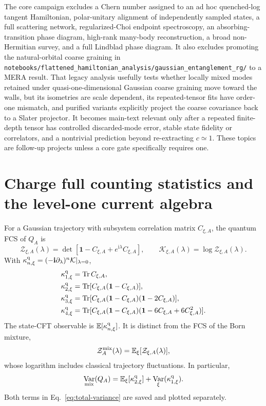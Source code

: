 \documentclass[aps,prx,onecolumn,nofootinbib,superscriptaddress,longbibliography]{revtex4-2}
\DeclareMathOperator{\Var}{Var}
\newcommand{\ii}{\boldsymbol{\mathrm{i}}}
\newcommand{\mc}[1]{\mathcal{#1}}
\newcommand{\Id}{\mathbf{1}}
\newcommand{\E}{\mathbb{E}}
\newcommand{\qTr}{\operatorname{Tr}}
\newcommand{\code}[1]{\texttt{#1}}
\begin{document}
The core campaign excludes a Chern number assigned to an ad hoc quenched-log tangent
Hamiltonian, polar-unitary alignment of independently sampled states, a full scattering
network, regularized-Choi endpoint spectroscopy, an absorbing-transition phase diagram,
high-rank many-body reconstruction, a broad non-Hermitian survey, and a full Lindblad phase
diagram.  It also excludes promoting the natural-orbital coarse graining in
\code{notebooks/flattened\_hamiltonian\_analysis/gaussian\_entanglement\_rg/} to a MERA
result.  That legacy analysis usefully tests whether locally mixed modes retained under
quasi-one-dimensional Gaussian coarse graining move toward the walls, but its isometries
are scale dependent, its repeated-tensor fits have order-one mismatch, and purified
variants explicitly project the coarse covariance back to a Slater projector.  It becomes
main-text relevant only after a repeated finite-depth tensor has controlled discarded-mode
error, stable state fidelity or correlators, and a nontrivial prediction beyond
re-extracting $c\simeq1$.  These topics are follow-up projects unless a core gate
specifically requires one.

\appendix

\section{Charge full counting statistics and the level-one current algebra}
\label{app:fcs}

For a Gaussian trajectory with subsystem correlation matrix $C_{\xi,A}$, the quantum FCS
of $Q_A$ is
\begin{equation}
 \mc Z_{\xi,A}(\lambda)
 =\det\!\left[\Id-C_{\xi,A}+e^{\ii\lambda}C_{\xi,A}\right],
 \qquad
 \mc K_{\xi,A}(\lambda)=\log\mc Z_{\xi,A}(\lambda).
\end{equation}
With $\kappa_{n,\xi}^{\rm q}=(-\ii\partial_\lambda)^n\mc K|_{\lambda=0}$,
\begin{align}
 \kappa_{1,\xi}^{\rm q}&=\qTr C_{\xi,A},\\
 \kappa_{2,\xi}^{\rm q}&=\qTr[C_{\xi,A}(\Id-C_{\xi,A})],\\
 \kappa_{3,\xi}^{\rm q}&=\qTr[C_{\xi,A}(\Id-C_{\xi,A})(\Id-2C_{\xi,A})],\\
 \kappa_{4,\xi}^{\rm q}&=\qTr[C_{\xi,A}(\Id-C_{\xi,A})
 (\Id-6C_{\xi,A}+6C_{\xi,A}^2)].
\end{align}
The state-CFT observable is $\E[\kappa_{n,\xi}^{\rm q}]$.  It is distinct from the FCS of
the Born mixture,
\begin{equation}
 \mc Z_A^{\rm mix}(\lambda)=\E_\xi[\mc Z_{\xi,A}(\lambda)],
\end{equation}
whose logarithm includes classical trajectory fluctuations.  In particular,
\begin{equation}
 \Var_{\rm mix}(Q_A)=
 \E_\xi[\kappa_{2,\xi}^{\rm q}]
 +\Var_\xi(\kappa_{1,\xi}^{\rm q}).
 \label{eq:total-variance}
\end{equation}
Both terms in Eq.~\eqref{eq:total-variance} are saved and plotted separately.
\end{document}
